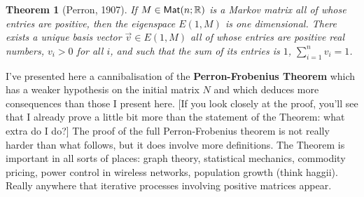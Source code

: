 \documentclass[11pt]{amsbook}
\newtheorem{theorem}{Theorem}[section]
\theoremstyle{definition}
\begin{document}
\begin{theorem}[Perron, 1907] \label{perron}
If $M\in {\sf Mat}(n; \mathbb{R})$ is a Markov matrix all of whose entries are positive, then the eigenspace $E(1, M)$ is one dimensional.  There exists a unique basis vector $\vec{v} \in E(1, M)$ all of whose entries are positive real numbers, $v_i >0$ for all $i$, and such that the sum of its entries is $1$, $\sum_{i=1}^n v_i = 1$.
\end{theorem}
I've presented here a cannibalisation of the {\bf Perron-Frobenius Theorem} which has a weaker hypothesis on the initial matrix $N$ and which deduces more consequences than those I present here. [If you look closely at the proof, you'll see that I already prove a little bit more than the statement of the Theorem: what extra do I do?] The proof of the full Perron-Frobenius theorem is not really harder than what follows, but it does involve more definitions. The Theorem is important in all sorts of places: graph theory, statistical mechanics, commodity pricing, power control in wireless networks, population growth (think haggii). Really anywhere that iterative processes involving positive matrices appear.
\end{document}
